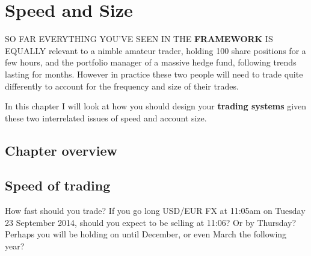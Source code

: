 \chapter{Speed and Size}

SO FAR EVERYTHING YOU'VE SEEN IN THE \textbf{FRAMEWORK} IS EQUALLY relevant to a nimble amateur trader, holding 100 share positions for a few hours, and the portfolio manager of a massive hedge fund, following trends lasting for months. However in practice these two people will need to trade quite differently to account for the frequency and size of their trades.

In this chapter I will look at how you should design your \textbf{trading systems} given these two interrelated issues of speed and account size.

\section*{Chapter overview}  {}

\begin{chapteroverviewtable}
\end{chapteroverviewtable}

\section*{Speed of trading}  {}

How fast should you trade? If you go long USD/EUR FX at 11:05am on Tuesday 23 September 2014, should you expect to be selling at 11:06? Or by Thursday? Perhaps you will be holding on until December, or even March the following year?

